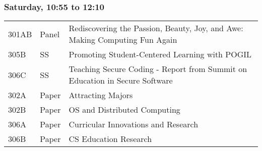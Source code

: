 



\subsubsection*{Saturday, 10:55 to 12:10}
\begin{tabular*}{5in}{@{}p{0.5in}@{}p{0.75in}@{}p{3.75in}}

301AB & Panel & Rediscovering the Passion, Beauty, Joy, and Awe:  Making Computing Fun Again \\

305B & SS & Promoting Student-Centered Learning with POGIL \\

306C & SS & Teaching Secure Coding - Report from Summit on Education in Secure Software \\

302A & Paper & Attracting Majors \\

302B & Paper & OS and Distributed Computing \\

306A & Paper & Curricular Innovations and Research \\

306B & Paper & CS Education Research \\


\end{tabular*}
